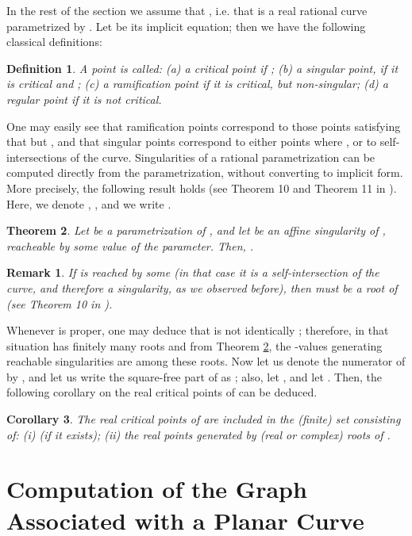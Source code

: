 \documentclass{elsart}
\newtheorem{theorem}{{\bf Theorem}}
\newtheorem{remark}{{\bf Remark}}
\newtheorem{definition}[theorem]{{\bf Definition}}
\newtheorem{corollary}[theorem]{{\bf Corollary}}
\begin{document}
In the rest of the section we assume that , i.e.
that  is a real rational curve
 parametrized by . Let 
be its implicit equation; then we have the following classical definitions:


\begin{definition} \label{def-crit-points}
A point  is  called: (a) {\sf a critical point}
if ; (b) {\sf a singular
point}, if it is critical and ; (c) {\sf a ramification point} if it is critical, but
non-singular; (d) {\sf a  regular point} if it is not critical.
\end{definition}

One may easily see that ramification points
correspond to those points satisfying that  but , and that
singular points correspond to either points where , or to
self-intersections of the curve. Singularities of a rational parametrization
can be computed directly from the parametrization, without converting to
implicit form. More precisely, the following result holds (see Theorem 10 and Theorem 11 in \cite{Sonia}).
Here, we denote , , and we write
.

\begin{theorem} \label{th-sing-param}
Let  be a parametrization of , and let  be an affine singularity
of , reacheable by some value  of the parameter. Then, .
\end{theorem}

\begin{remark} \label{inf-sing}
If  is reached by some  (in that case it is a
self-intersection of
the curve, and therefore a
singularity,
as we observed before), then  must be a root of 
(see Theorem 10 in
\cite{Sonia}).
\end{remark}


Whenever  is proper, one may
deduce that  is not identically ; therefore, in that situation  has finitely many roots and from Theorem \ref{th-sing-param}, the -values generating reachable singularities are among these roots. Now let us denote the numerator of  by , and let us write the square-free part of  as ; also, let , and let . Then, the following corollary on the real critical points of 
can be deduced.

\begin{corollary} \label{gen-critical}
The real critical points of  are included in the (finite) set consisting of: (i)  (if it exists); (ii) the real points generated by (real or complex) roots of .
\end{corollary}


\section{Computation of the Graph Associated with a Planar Curve} \label{plane-case}
\end{document}
